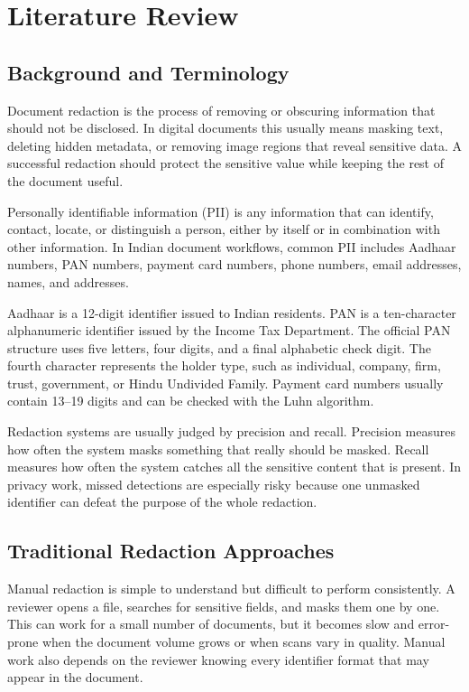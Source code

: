\chapter{Literature Review}

\section{Background and Terminology}

Document redaction is the process of removing or obscuring information that should not be disclosed. In digital documents this usually means masking text, deleting hidden metadata, or removing image regions that reveal sensitive data. A successful redaction should protect the sensitive value while keeping the rest of the document useful.

Personally identifiable information (PII) is any information that can identify, contact, locate, or distinguish a person, either by itself or in combination with other information. In Indian document workflows, common PII includes Aadhaar numbers, PAN numbers, payment card numbers, phone numbers, email addresses, names, and addresses.

Aadhaar is a 12-digit identifier issued to Indian residents. PAN is a ten-character alphanumeric identifier issued by the Income Tax Department. The official PAN structure uses five letters, four digits, and a final alphabetic check digit. The fourth character represents the holder type, such as individual, company, firm, trust, government, or Hindu Undivided Family. Payment card numbers usually contain 13--19 digits and can be checked with the Luhn algorithm.

Redaction systems are usually judged by precision and recall. Precision measures how often the system masks something that really should be masked. Recall measures how often the system catches all the sensitive content that is present. In privacy work, missed detections are especially risky because one unmasked identifier can defeat the purpose of the whole redaction.

\section{Traditional Redaction Approaches}

Manual redaction is simple to understand but difficult to perform consistently. A reviewer opens a file, searches for sensitive fields, and masks them one by one. This can work for a small number of documents, but it becomes slow and error-prone when the document volume grows or when scans vary in quality. Manual work also depends on the reviewer knowing every identifier format that may appear in the document.


